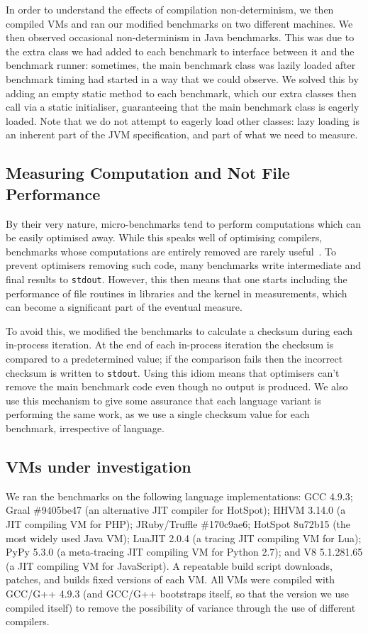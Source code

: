 \documentclass[preprint,numbers,10pt]{sigplanconf}
\begin{document}
In order to understand the effects of compilation non-determinism,
we then compiled VMs and ran our modified benchmarks on two different machines.
We then observed occasional non-determinism in Java benchmarks.
This was due to the extra class we had added to each benchmark
to interface between it and the benchmark runner: sometimes, the
main benchmark class was lazily loaded after benchmark timing had started in a
way that we could observe. We
solved this by adding an empty static method to each benchmark, which our
extra classes then call via a static initialiser, guaranteeing that
the main benchmark class is eagerly loaded. Note that we do not attempt to eagerly
load other classes: lazy loading is an inherent part of the JVM specification,
and part of what we need to measure.


\subsection{Measuring Computation and Not File Performance}

By their very nature, micro-benchmarks tend to perform computations which
can be easily optimised away. While this speaks well of
optimising compilers, benchmarks whose computations
are entirely removed are rarely useful~\cite{seaton15phd}. To prevent optimisers
removing such code, many benchmarks write intermediate and final results
to \texttt{stdout}. However, this then means that one starts including
the performance of file routines in libraries and the kernel in measurements,
which can become a significant part of the eventual measure.

To avoid this, we modified the benchmarks to calculate a checksum
during each in-process iteration. At the end of each in-process iteration
the checksum is compared to a predetermined value; if the comparison fails then
the incorrect checksum is written to \texttt{stdout}. Using this idiom
means that optimisers can't remove the main benchmark code even though
no output is produced. We also use this mechanism to give some assurance
that each language variant is performing the same work, as we use a single
checksum value for each benchmark, irrespective of language.


\subsection{VMs under investigation}

We ran the benchmarks on the following language implementations: GCC 4.9.3;
Graal \#9405be47 (an alternative JIT compiler for HotSpot); HHVM 3.14.0 (a JIT
compiling VM for PHP); JRuby/Truffle \#170c9ae6; HotSpot 8u72b15 (the most widely used Java
VM); LuaJIT 2.0.4 (a tracing JIT compiling VM for Lua); PyPy 5.3.0 (a
meta-tracing JIT compiling VM for Python 2.7); and V8 5.1.281.65 (a JIT
compiling VM for JavaScript). A repeatable build script downloads, patches,
and builds fixed versions of each VM. All VMs were compiled with GCC/G++ 4.9.3
(and GCC/G++ bootstraps itself, so that the version we use compiled itself)
to remove the possibility of variance through the use of different compilers.
\end{document}

